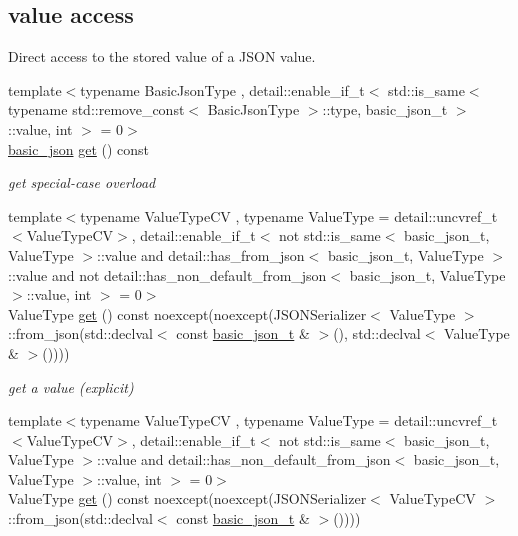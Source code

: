 \subsection*{value access}
\label{_amgrpd8f53c9caf18314e5b3f758245606995}%
Direct access to the stored value of a J\+S\+ON value. \begin{DoxyCompactItemize}
\item 
{\footnotesize template$<$typename Basic\+Json\+Type , detail\+::enable\+\_\+if\+\_\+t$<$ std\+::is\+\_\+same$<$ typename std\+::remove\+\_\+const$<$ Basic\+Json\+Type $>$\+::type, basic\+\_\+json\+\_\+t $>$\+::value, int $>$  = 0$>$ }\\\mbox{\hyperlink{classnlohmann_1_1basic__json}{basic\+\_\+json}} \mbox{\hyperlink{classnlohmann_1_1basic__json_a6b187a22994c12c8cae0dd5ee99dc85e}{get}} () const
\begin{DoxyCompactList}\small\item\em get special-\/case overload \end{DoxyCompactList}\item 
{\footnotesize template$<$typename Value\+Type\+CV , typename Value\+Type  = detail\+::uncvref\+\_\+t$<$\+Value\+Type\+C\+V$>$, detail\+::enable\+\_\+if\+\_\+t$<$ not std\+::is\+\_\+same$<$ basic\+\_\+json\+\_\+t, Value\+Type $>$\+::value and detail\+::has\+\_\+from\+\_\+json$<$ basic\+\_\+json\+\_\+t, Value\+Type $>$\+::value and not detail\+::has\+\_\+non\+\_\+default\+\_\+from\+\_\+json$<$ basic\+\_\+json\+\_\+t, Value\+Type $>$\+::value, int $>$  = 0$>$ }\\Value\+Type \mbox{\hyperlink{classnlohmann_1_1basic__json_aa6602bb24022183ab989439e19345d08}{get}} () const noexcept(noexcept(J\+S\+O\+N\+Serializer$<$ Value\+Type $>$\+::from\+\_\+json(std\+::declval$<$ const \mbox{\hyperlink{classnlohmann_1_1basic__json}{basic\+\_\+json\+\_\+t}} \& $>$(), std\+::declval$<$ Value\+Type \& $>$())))
\begin{DoxyCompactList}\small\item\em get a value (explicit) \end{DoxyCompactList}\item 
{\footnotesize template$<$typename Value\+Type\+CV , typename Value\+Type  = detail\+::uncvref\+\_\+t$<$\+Value\+Type\+C\+V$>$, detail\+::enable\+\_\+if\+\_\+t$<$ not std\+::is\+\_\+same$<$ basic\+\_\+json\+\_\+t, Value\+Type $>$\+::value and detail\+::has\+\_\+non\+\_\+default\+\_\+from\+\_\+json$<$ basic\+\_\+json\+\_\+t, Value\+Type $>$\+::value, int $>$  = 0$>$ }\\Value\+Type \mbox{\hyperlink{classnlohmann_1_1basic__json_a5afa21d477e13fa7a3dcd7ea66c48b52}{get}} () const noexcept(noexcept(J\+S\+O\+N\+Serializer$<$ Value\+Type\+CV $>$\+::from\+\_\+json(std\+::declval$<$ const \mbox{\hyperlink{classnlohmann_1_1basic__json}{basic\+\_\+json\+\_\+t}} \& $>$())))

\end{DoxyCompactItemize}
